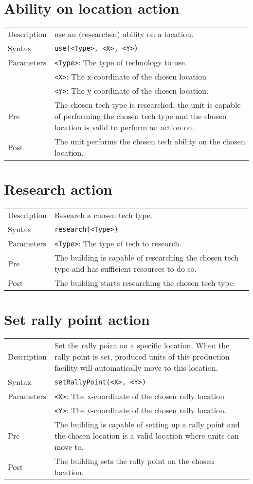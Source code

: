 \section{Ability on location action}
\begin{tabularx}{\textwidth}{lX}
 Description & use an (researched) ability on a location. \\
 Syntax & \verb|use(<Type>, <X>, <Y>)| \\
 Parameters & \verb|<Type>|: The type of technology to use.\\
            & \verb|<X>|: The x-coordinate of the chosen location \\
            & \verb|<Y>|: The y-coordinate of the chosen location. \\
 Pre & The chosen tech type is researched, the unit is capable of performing the chosen tech type and the chosen location is valid to perform an action on. \\
 Post & The unit performs the chosen tech ability on the chosen location.
\end{tabularx}

\section{Research action}
\begin{tabularx}{\textwidth}{lX}
 Description & Research a chosen tech type. \\
 Syntax & \verb|research(<Type>)| \\
 Parameters & \verb|<Type>|: The type of tech to research.\\
 Pre & The building is capable of researching the chosen tech type and has sufficient resources to do so. \\
 Post & The building starts researching the chosen tech type.
\end{tabularx}

\section{Set rally point action}
\begin{tabularx}{\textwidth}{lX}
 Description & Set the rally point on a specific location. When the rally point is set, produced units of this production facility will automatically move to this location. \\
 Syntax & \verb|setRallyPoint(<X>, <Y>)| \\
 Parameters & \verb|<X>|: The x-coordinate of the chosen rally location \\
            & \verb|<Y>|: The y-coordinate of the chosen rally location. \\
 Pre & The building is capable of setting up a rally point and the chosen location is a valid location where units can move to. \\
 Post & The building sets the rally point on the chosen location.
\end{tabularx}

